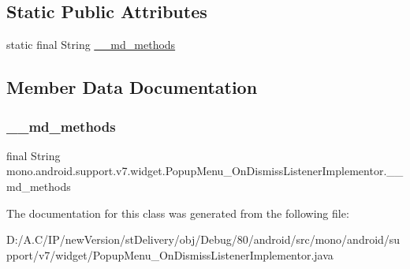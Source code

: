 \subsection*{Static Public Attributes}
\begin{DoxyCompactItemize}
\item 
static final String \hyperlink{classmono_1_1android_1_1support_1_1v7_1_1widget_1_1_popup_menu___on_dismiss_listener_implementor_acfbe85e634b5066ac1cdc76d4d5a81c5}{\+\_\+\+\_\+md\+\_\+methods}
\end{DoxyCompactItemize}


\subsection{Member Data Documentation}
\mbox{\label{classmono_1_1android_1_1support_1_1v7_1_1widget_1_1_popup_menu___on_dismiss_listener_implementor_acfbe85e634b5066ac1cdc76d4d5a81c5}} 
\subsubsection{\texorpdfstring{\+\_\+\+\_\+md\+\_\+methods}{\_\_md\_methods}}
{\footnotesize\ttfamily final String mono.\+android.\+support.\+v7.\+widget.\+Popup\+Menu\+\_\+\+On\+Dismiss\+Listener\+Implementor.\+\_\+\+\_\+md\+\_\+methods\hspace{0.3cm}{\ttfamily [static]}}



The documentation for this class was generated from the following file\+:\begin{DoxyCompactItemize}
\item 
D\+:/\+A.\+C/\+I\+P/new\+Version/st\+Delivery/obj/\+Debug/80/android/src/mono/android/support/v7/widget/Popup\+Menu\+\_\+\+On\+Dismiss\+Listener\+Implementor.\+java\end{DoxyCompactItemize}
